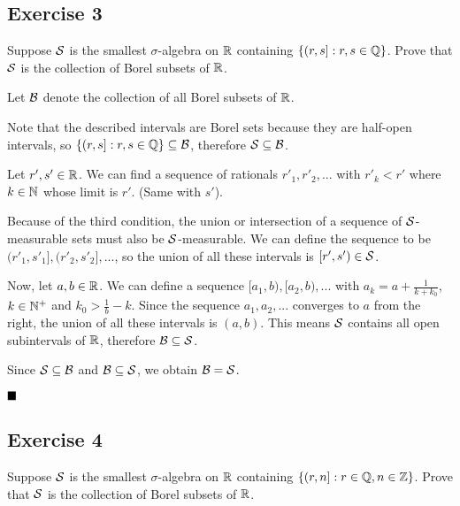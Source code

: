 \subsection{Exercise 3}

\begin{formulationBox}
	Suppose $\mathcal{S}$ is the smallest $\sigma$-algebra on $\mathbb{R}$ containing $\{(r,s]:r,s\in\mathbb{Q}\}$. Prove that $\mathcal{S}$ is the collection of Borel subsets of $\mathbb{R}$.
\end{formulationBox}

Let $\mathcal{B}$ denote the collection of all Borel subsets of $\mathbb{R}$.

Note that the described intervals are Borel sets because they are half-open intervals, so $\{(r,s]:r,s\in\mathbb{Q}\}\subseteq\mathcal{B}$, therefore $\mathcal{S}\subseteq\mathcal{B}$.

Let $r',s'\in\mathbb{R}$. We can find a sequence of rationals $r'_1, r'_2, ...$ with $r'_k < r'$ where $k\in\mathbb{N}$ whose limit is $r'$. (Same with $s'$).

Because of the third condition, the union or intersection of a sequence of $\mathcal{S}$-measurable sets must also be $\mathcal{S}$-measurable. We can define the sequence to be $(r'_1, s'_1], (r'_2,s'_2], ...$, so the union of all these intervals is $[r', s')\in\mathcal{S}$.

Now, let $a,b\in\mathbb{R}$. We can define a sequence $[a_1, b), [a_2, b), ...$ with $a_k = a+\frac{1}{k+k_0}$, $k\in\mathbb{N}^+$ and $k_0>\frac{1}{b}-k$. Since the sequence $a_1, a_2, ...$ converges to $a$ from the right, the union of all these intervals is $(a, b)$. This means $\mathcal{S}$ contains all open subintervals of $\mathbb{R}$, therefore $\mathcal{B} \subseteq \mathcal{S}$.

Since $\mathcal{S}\subseteq\mathcal{B}$ and $\mathcal{B} \subseteq \mathcal{S}$, we obtain $\mathcal{B} = \mathcal{S}$.

$\qed$

\subsection{Exercise 4}

\begin{formulationBox}
	Suppose $\mathcal{S}$ is the smallest $\sigma$-algebra on $\mathbb{R}$ containing $\{(r,n]:r\in\mathbb{Q},n\in\mathbb{Z}\}$. Prove that $\mathcal{S}$ is the collection of Borel subsets of $\mathbb{R}$.
\end{formulationBox}

